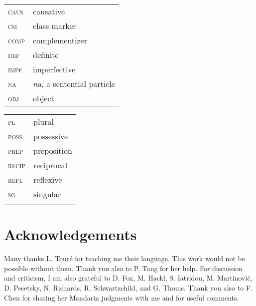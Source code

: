 \documentclass[output=paper]{langscibook}
\begin{document}
\begin{tabularx}{.5\textwidth}{@{}lX@{}}
\textsc{caus} & causative\\
\textsc{cm} & class marker\\
\textsc{comp} & complementizer\\
\textsc{def} & definite\\
\textsc{impf} & imperfective\\
\textsc{na} & \textit{na}, a sentential particle\\
\textsc{obj} & object\\
\end{tabularx}
\begin{tabularx}{.5\textwidth}{@{}lX@{}}
\textsc{pl} & plural\\
\textsc{poss} & possessive\\  
\textsc{prep} & preposition\\
\textsc{recip} & reciprocal\\
\textsc{refl} & reflexive\\
\textsc{sg} & singular\\
&\\
\end{tabularx}



\section*{Acknowledgements}
Many thanks L. Tour\'{e} for teaching me their language. This work would not be possible without them. Thank you also to P. Tang for her help. For discussion and criticism, I am also grateful to D. Fox, M. Hackl, S. Iatridou, M. Martinovi\'{c}, D. Pesetsky, N. Richards, R. Schwartzchild, and G. Thoms. Thank you also to F. Chen for sharing her Mandarin judgments with me and for useful comments.

{\sloppy\printbibliography[heading=subbibliography,notkeyword=this]}
\end{document}

